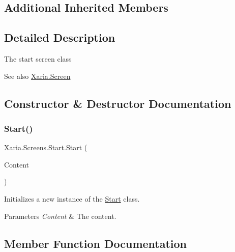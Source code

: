\subsection*{Additional Inherited Members}


\subsection{Detailed Description}
The start screen class 

\begin{DoxySeeAlso}{See also}
\hyperlink{classXaria_1_1Screen}{Xaria.\+Screen}


\end{DoxySeeAlso}


\subsection{Constructor \& Destructor Documentation}
\mbox{\label{classXaria_1_1Screens_1_1Start_ada7d2e5e90ae995a6a11cd040e383e79}} 
\subsubsection{\texorpdfstring{Start()}{Start()}}
{\footnotesize\ttfamily Xaria.\+Screens.\+Start.\+Start (\begin{DoxyParamCaption}\item[{Content\+Manager}]{Content }\end{DoxyParamCaption})\hspace{0.3cm}{\ttfamily [inline]}}



Initializes a new instance of the \hyperlink{classXaria_1_1Screens_1_1Start}{Start} class. 


\begin{DoxyParams}{Parameters}
{\em Content} & The content.\\
\hline
\end{DoxyParams}


\subsection{Member Function Documentation}
\mbox{\label{classXaria_1_1Screens_1_1Start_a4d1d092a06279487dc869e87c9442a11}} 
